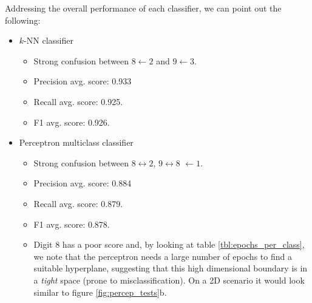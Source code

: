 Addressing the overall performance of each classifier, we can point out the following:
\begin{itemize}
	\item $k$-NN classifier
	\begin{itemize}
		\item Strong confusion between $8 \gets 2$ and $9 \gets 3$.
		\item Precision avg. score: 0.933
		\item Recall avg. score: 0.925.
		\item F1 avg. score: 0.926.
	\end{itemize}
	\item Perceptron multiclass classifier
	\begin{itemize}
		\item Strong confusion between $8 \leftrightarrow 2$, $9 \leftrightarrow 8$ $ \gets 1$.
		\item Precision avg. score: 0.884
		\item Recall avg. score: 0.879.
		\item F1 avg. score: 0.878.
		\item Digit $8$ has a poor score and, by looking at table \ref{tbl:epochs_per_class}, we note that the perceptron needs a large number of epochs to find a suitable hyperplane, suggesting that this high dimensional boundary is in a \textit{tight} space (prone to misclassification). On a 2D scenario it would look similar to figure \ref{fig:percep_tests}b.
	\end{itemize}
\end{itemize}
